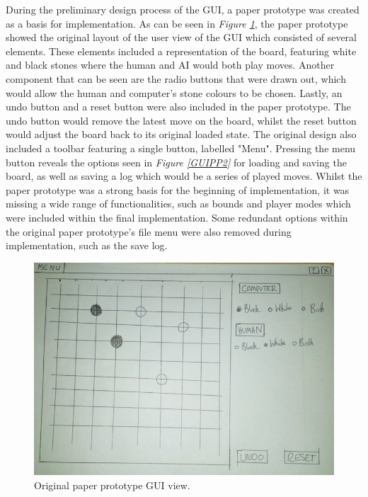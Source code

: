 \documentclass{l3proj}
\begin{document}
During the preliminary design process of the GUI, a paper prototype was created as a basis for implementation. As can be seen in \textit{Figure \ref{GUIPP1}}, the paper prototype showed the original layout of the user view of the GUI which consisted of several elements. These elements included a representation of the board, featuring white and black stones where the human and AI would both play moves. Another component that can be seen are the radio buttons that were drawn out, which would allow the human and computer's stone colours to be chosen. Lastly, an undo button and a reset button were also included in the paper prototype. The undo button would remove the latest move on the board, whilst the reset button would adjust the board back to its original loaded state. The original design also included a toolbar featuring a single button, labelled "Menu".  Pressing the menu button reveals the options seen in \textit{Figure \ref{GUIPP2}} for loading and saving the board, as well as saving a log which would be a series of played moves. Whilst the paper prototype was a strong basis for the beginning of implementation, it was missing a wide range of functionalities, such as bounds and player modes which were included within the final implementation. Some redundant options within the original paper prototype's file menu were also removed during implementation, such as the save log.

\begin{figure}[H]
\centering
\includegraphics[scale=0.4]{Images/GUI-1-PP.png}
\caption{Original paper prototype GUI view.}
\label{GUIPP1}
\end{figure}
\end{document}
